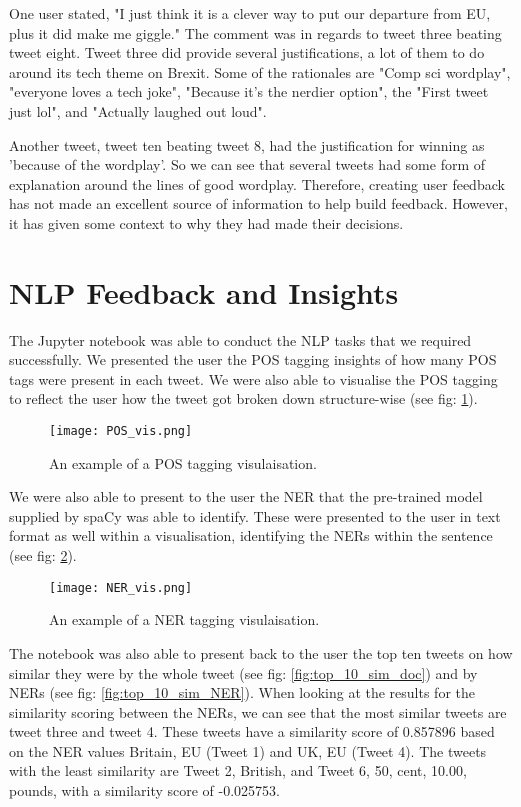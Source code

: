 	One user stated, "I just think it is a clever way to put our departure from EU, plus it did make me giggle." The comment was in regards to tweet three beating tweet eight. Tweet three did provide several justifications, a lot of them to do around its tech theme on Brexit. Some of the rationales are "Comp sci wordplay", "everyone loves a tech joke", "Because it's the nerdier option", the "First tweet just lol", and "Actually laughed out loud".
	
	Another tweet, tweet ten beating tweet 8, had the justification for winning as 'because of the wordplay'. So we can see that several tweets had some form of explanation around the lines of good wordplay. Therefore, creating user feedback has not made an excellent source of information to help build feedback. However, it has given some context to why they had made their decisions.


\section{NLP Feedback and Insights}
\label{sec:reaults_NLP}

	The Jupyter notebook was able to conduct the NLP tasks that we required successfully. We presented the user the POS tagging insights of how many POS tags were present in each tweet. We were also able to visualise the POS tagging to reflect the user how the tweet got broken down structure-wise (see fig: \ref{fig:POS_example}).
	
	\begin{figure}[h]
		\centering
		\texttt{[image: POS\_vis.png]}
		\caption{An example of a POS tagging visulaisation.}
		\label{fig:POS_example}
		
	\end{figure}

	We were also able to present to the user the NER that the pre-trained model supplied by spaCy was able to identify. These were presented to the user in text format as well within a visualisation, identifying the NERs within the sentence (see fig: \ref{fig:NER_example}).
	
	\begin{figure}[h]
		\centering
		\texttt{[image: NER\_vis.png]}
		\caption{An example of a NER tagging visulaisation.}
		\label{fig:NER_example}
		
	\end{figure}

	The notebook was also able to present back to the user the top ten tweets on how similar they were by the whole tweet (see fig: \ref{fig:top_10_sim_doc}) and by NERs (see fig: \ref{fig:top_10_sim_NER}). When looking at the results for the similarity scoring between the NERs, we can see that the most similar tweets are tweet three and tweet 4. These tweets have a similarity score of 0.857896 based on the NER values Britain, EU (Tweet 1) and UK, EU (Tweet 4). The tweets with the least similarity are Tweet 2, British, and Tweet 6, 50, cent, 10.00, pounds, with a similarity score of -0.025753.
	 
